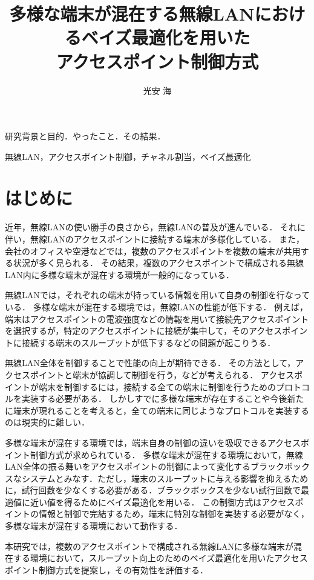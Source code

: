 \documentclass[a4paper,11pt]{jarticle}
\title{多様な端末が混在する無線LANにおけるベイズ最適化を用いた\\アクセスポイント制御方式}
\author{光安 海}
\begin{document}
\titlepage    %
\abstract     %
研究背景と目的．やったこと．その結果．

\keyword
無線LAN，アクセスポイント制御，チャネル割当，ベイズ最適化
\tableofcontents    %
%
%
\section{はじめに}
近年，無線LANの使い勝手の良さから，無線LANの普及が進んでいる．
それに伴い，無線LANのアクセスポイントに接続する端末が多様化している．
また，会社のオフィスや空港などでは，複数のアクセスポイントを複数の端末が共用する状況が多く見られる．
その結果，複数のアクセスポイントで構成される無線LAN内に多様な端末が混在する環境が一般的になっている．

無線LANでは，それぞれの端末が持っている情報を用いて自身の制御を行なっている．
多様な端末が混在する環境では，無線LANの性能が低下する．
例えば，端末はアクセスポイントの電波強度などの情報を用いて接続先アクセスポイントを選択するが，特定のアクセスポイントに接続が集中して，そのアクセスポイントに接続する端末のスループットが低下するなどの問題が起こりうる．

無線LAN全体を制御することで性能の向上が期待できる．
その方法として，アクセスポイントと端末が協調して制御を行う，などが考えられる．
アクセスポイントが端末を制御するには，接続する全ての端末に制御を行うためのプロトコルを実装する必要がある．
しかしすでに多様な端末が存在することや今後新たに端末が現れることを考えると，全ての端末に同じようなプロトコルを実装するのは現実的に難しい．

多様な端末が混在する環境では，端末自身の制御の違いを吸収できるアクセスポイント制御方式が求められている．
多様な端末が混在する環境において，無線LAN全体の振る舞いをアクセスポイントの制御によって変化するブラックボックスなシステムとみなす．ただし，端末のスループットに与える影響を抑えるために，試行回数を少なくする必要がある．ブラックボックスを少ない試行回数で最適値に近い値を得るためにベイズ最適化を用いる．
この制御方式はアクセスポイントの情報と制御で完結するため，端末に特別な制御を実装する必要がなく，多様な端末が混在する環境において動作する．

本研究では，複数のアクセスポイントで構成される無線LANに多様な端末が混在する環境において，スループット向上のためのベイズ最適化を用いたアクセスポイント制御方式を提案し，その有効性を評価する．
\end{document}
